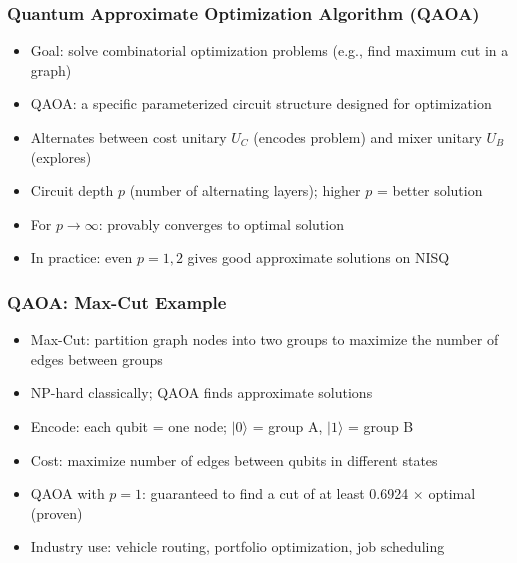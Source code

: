 \begin{frame}[fragile]\frametitle{Quantum Approximate Optimization Algorithm (QAOA)}
\begin{itemize}
\item Goal: solve combinatorial optimization problems (e.g., find maximum cut in a graph)
\item QAOA: a specific parameterized circuit structure designed for optimization
\item Alternates between cost unitary $U_C$ (encodes problem) and mixer unitary $U_B$ (explores)
\item Circuit depth $p$ (number of alternating layers); higher $p$ = better solution
\item For $p \to \infty$: provably converges to optimal solution
\item In practice: even $p=1,2$ gives good approximate solutions on NISQ
\end{itemize}
\end{frame}

\begin{frame}[fragile]\frametitle{QAOA: Max-Cut Example}
\begin{itemize}
\item Max-Cut: partition graph nodes into two groups to maximize the number of edges between groups
\item NP-hard classically; QAOA finds approximate solutions
\item Encode: each qubit = one node; $|0\rangle$ = group A, $|1\rangle$ = group B
\item Cost: maximize number of edges between qubits in different states
\item QAOA with $p=1$: guaranteed to find a cut of at least 0.6924 $\times$ optimal (proven)
\item Industry use: vehicle routing, portfolio optimization, job scheduling
\end{itemize}
\end{frame}

